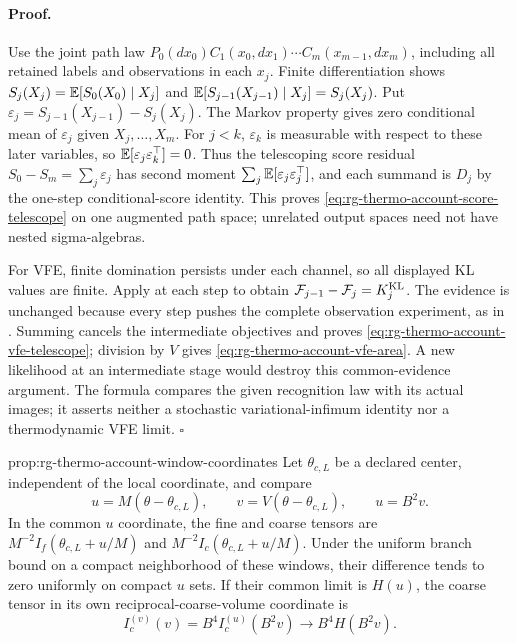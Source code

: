 \paragraph{Proof.}
Use the joint path law
$P_0(dx_0)C_1(x_0,dx_1)\cdots C_m(x_{m-1},dx_m)$, including
all retained labels and observations in each $x_j$. Finite differentiation
shows $S_j(X_j)=\mathbb E[S_0(X_0)\mid X_j]$ and
$\mathbb E[S_{j-1}(X_{j-1})\mid X_j]=S_j(X_j)$. Put
$\varepsilon_j=S_{j-1}(X_{j-1})-S_j(X_j)$. The Markov property
gives zero conditional mean of $\varepsilon_j$ given
$X_j,\ldots,X_m$. For $j<k$, $\varepsilon_k$ is measurable with
respect to these later variables, so
$\mathbb E[\varepsilon_j\varepsilon_k^\top]=0$. Thus the telescoping
score residual $S_0-S_m=\sum_j\varepsilon_j$ has second moment
$\sum_j\mathbb E[\varepsilon_j\varepsilon_j^\top]$, and each summand is
$D_j$ by the one-step conditional-score identity. This proves
\cref{eq:rg-thermo-account-score-telescope} on one augmented path
space; unrelated output spaces need not have nested sigma-algebras.

For VFE, finite domination persists under each channel, so all displayed
KL values are finite. Apply
 at each step to obtain
$\mathcal F_{j-1}-\mathcal F_j=K_j^{\mathrm{KL}}$. The evidence is
unchanged because every step pushes the complete observation experiment,
as in . Summing cancels
the intermediate objectives and proves
\cref{eq:rg-thermo-account-vfe-telescope}; division by $V$ gives
\cref{eq:rg-thermo-account-vfe-area}. A new likelihood at an
intermediate stage would destroy this common-evidence argument.
The formula compares the given recognition law with its actual images;
it asserts neither a stochastic variational-infimum identity nor a
thermodynamic VFE limit. $\square$

{prop:rg-thermo-account-window-coordinates}
Let $\theta_{c,L}$ be a declared center, independent of the local
coordinate, and compare
\begin{equation}
 u=M(\theta-\theta_{c,L}),\qquad
 v=V(\theta-\theta_{c,L}),\qquad u=B^2v.
 \label{eq:rg-thermo-account-window-chart}
\end{equation}
In the common $u$ coordinate, the fine and coarse tensors are
$M^{-2}I_f(\theta_{c,L}+u/M)$ and
$M^{-2}I_c(\theta_{c,L}+u/M)$. Under the uniform branch bound
on a compact neighborhood of these windows, their difference tends to
zero uniformly on compact $u$ sets. If their common limit is $H(u)$,
the coarse tensor in its own reciprocal-coarse-volume coordinate is
\begin{equation}
 I_c^{(v)}(v)=B^4 I_c^{(u)}(B^2v)
 \longrightarrow B^4H(B^2v).
 \label{eq:rg-thermo-account-window-pullback}
\end{equation}\thermoestablishedstatus


